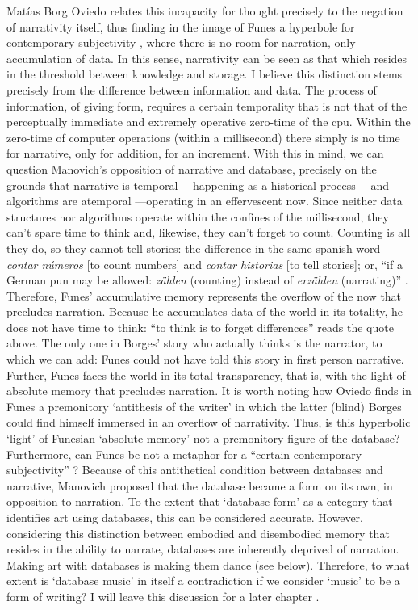 Matías Borg Oviedo \parencite{Ovi19:Mem} relates this incapacity for thought precisely to the negation of narrativity itself, thus finding in the image of Funes a hyperbole for contemporary subjectivity \parencite[5]{Ovi19:Mem}, where there is no room for narration, only accumulation of data. In this sense, narrativity can be seen as that which resides in the threshold between knowledge and storage. I believe this distinction stems precisely from the difference between information and data. The process of information, of giving form, requires a certain temporality that is not that of the perceptually immediate and extremely operative zero-time of the \gls{cpu}. Within the zero-time of computer operations (within a millisecond) there simply is no time for narrative, only for addition, for an increment. With this in mind, we can question Manovich's opposition of narrative and database, precisely on the grounds that narrative is temporal ---happening as a historical process--- and algorithms are atemporal ---operating in an effervescent now. Since neither data structures nor algorithms operate within the confines of the millisecond, they can't spare time to think and, likewise, they can't forget to count. Counting is all they do, so they cannot tell stories: the difference in the same spanish word \textit{contar números} [to count numbers] and \textit{contar historias} [to tell stories]; or, ``if a German pun may be allowed: \textit{zählen} (counting) instead of \textit{erzählen} (narrating)'' \textcite[128]{Ern13:Dig}. Therefore, Funes' accumulative memory represents the overflow of the now that precludes narration. Because he accumulates data of the world in its totality, he does not have time to think: ``to think is to forget differences'' reads the quote above. The only one in Borges' story who actually thinks is the narrator, to which we can add: Funes could not have told this story in first person narrative. Further, Funes faces the world in its total transparency, that is, with the light of absolute memory that precludes narration. It is worth noting how Oviedo finds in Funes a premonitory `antithesis of the writer' in which the latter (blind) Borges could find himself immersed in an overflow of narrativity\parencite{Ovi19:Mem}. Thus, is this hyperbolic `light' of Funesian `absolute memory' not a premonitory figure of the database? Furthermore, can Funes be not a metaphor for a ``certain contemporary subjectivity'' \parencite[5]{Ovi19:Mem}? Because of this antithetical condition between databases and narrative, Manovich proposed that the database became a form on its own, in opposition to narration. To the extent that `database form' as a category that identifies art using databases, this can be considered accurate. However, considering this distinction between embodied and disembodied memory that resides in the ability to narrate, databases are inherently deprived of narration. Making art with databases is making them dance (see below). Therefore, to what extent is `database music' in itself a contradiction if we consider `music' to be a form of writing? I will leave this discussion for a later chapter .

